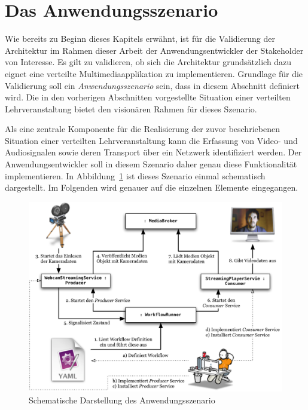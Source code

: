 

\section{Das Anwendungsszenario} %
\label{sub:das_anwendungsszenario}

  Wie bereits zu Beginn dieses Kapitels erwähnt, ist für die Validierung der Architektur im Rahmen dieser Arbeit der Anwendungsentwickler der Stakeholder von Interesse. Es gilt zu validieren, ob sich die Architektur grundsätzlich dazu eignet eine verteilte Multimediaapplikation zu implementieren. Grundlage für die Validierung soll ein \emph{Anwendungsszenario} sein, dass in diesem Abschnitt definiert wird. Die in den vorherigen Abschnitten vorgestellte Situation einer verteilten Lehrveranstaltung bietet den visionären Rahmen für dieses Szenario.
  
  Als eine zentrale Komponente für die Realisierung der zuvor beschriebenen Situation einer verteilten Lehrveranstaltung kann die Erfassung von Video- und Audiosignalen sowie deren Transport über ein Netzwerk identifiziert werden. Der Anwendungsentwickler soll in diesem Szenario daher genau diese Funktionalität implementieren. In Abbildung~\ref{fig:schema_des_anwendungsszenario} ist dieses Szenario einmal schematisch dargestellt. Im Folgenden wird genauer auf die einzelnen Elemente eingegangen.

\begin{figure}[ht]
  \centering
    \includegraphics[width=.9\textwidth]{images/Anwendungsszenario.pdf}
  \caption{Schematische Darstellung des Anwendungsszenario}
  \label{fig:schema_des_anwendungsszenario}
\end{figure}

